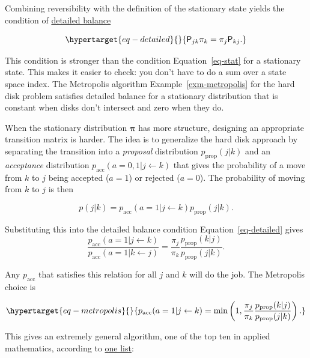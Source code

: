 \documentclass[
  letterpaper,
  DIV=11,
  numbers=noendperiod]{scrreprt}
\theoremstyle{definition}
\theoremstyle{remark}
\begin{document}
Combining reversibility with the definition of the stationary state
yields the condition of
\href{https://en.wikipedia.org/wiki/Detailed_balance}{detailed balance}

\begin{equation}\protect\hypertarget{eq-detailed}{}{
 \mathsf{P}_{jk}\pi_k = \pi_j\mathsf{P}_{kj}.
}\label{eq-detailed}\end{equation}

This condition is stronger than the condition Equation~\ref{eq-stat} for
a stationary state. This makes it easier to check: you don't have to do
a sum over a state space index. The Metropolis algorithm
Example~\ref{exm-metropolis} for the hard disk problem satisfies
detailed balance for a stationary distribution that is constant when
disks don't intersect and zero when they do.

When the stationary distribution \(\boldsymbol{\pi}\) has more
structure, designing an appropriate transition matrix is harder. The
idea is to generalize the hard disk approach by separating the
transition into a \emph{proposal} distribution \(p_\text{prop}(j|k)\)
and an \emph{acceptance} distribution
\(p_\text{acc}(a=0,1|j\leftarrow k)\) that gives the probability of a
move from \(k\) to \(j\) being accepted (\(a=1\)) or rejected (\(a=0\)).
The probability of moving from \(k\) to \(j\) is then

\[
p(j|k) = p_\text{acc}(a=1|j\leftarrow k) p_\text{prop}(j|k).
\]

Substituting this into the detailed balance condition
Equation~\ref{eq-detailed} gives \[
\frac{p_\text{acc}(a=1|j\leftarrow k)}{p_\text{acc}(a=1|k\leftarrow j)} = \frac{\pi_j}{\pi_k}\frac{p_\text{prop}(k|j)}{p_\text{prop}(j|k)}.
\]

Any \(p_\text{acc}\) that satisfies this relation for all \(j\) and
\(k\) will do the job. The Metropolis choice is

\begin{equation}\protect\hypertarget{eq-metropolis}{}{
p_\text{acc}(a=1|j \leftarrow k) = \min\left(1,  \frac{\pi_j}{\pi_k}\frac{p_\text{prop}(k|j)}{p_\text{prop}(j|k)}\right).
}\label{eq-metropolis}\end{equation}

This gives an extremely general algorithm, one of the top ten in applied
mathematics, according to
\href{https://nhigham.com/2016/03/29/the-top-10-algorithms-in-applied-mathematics/}{one
list}:
\end{document}
